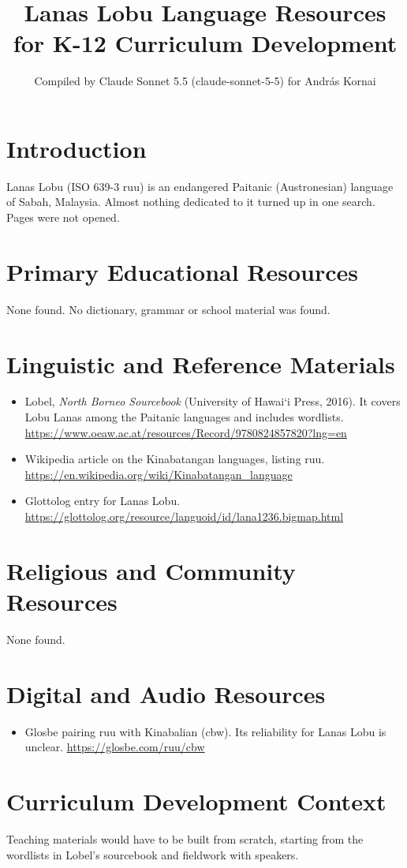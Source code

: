 \documentclass[12pt]{article}
\title{Lanas Lobu Language Resources for K-12 Curriculum Development}
\author{Compiled by Claude Sonnet 5.5 (claude-sonnet-5-5) for Andr\'as Kornai}
\date{}
\begin{document}
\maketitle
\section{Introduction}
Lanas Lobu (ISO 639-3 ruu) is an endangered Paitanic (Austronesian) language of Sabah, Malaysia. Almost nothing dedicated to it turned up in one search. Pages were not opened.

\section{Primary Educational Resources}
None found. No dictionary, grammar or school material was found.

\section{Linguistic and Reference Materials}
\begin{itemize}
\item Lobel, \emph{North Borneo Sourcebook} (University of Hawai\textquoteleft i Press, 2016). It covers Lobu Lanas among the Paitanic languages and includes wordlists. \url{https://www.oeaw.ac.at/resources/Record/9780824857820?lng=en}
\item Wikipedia article on the Kinabatangan languages, listing ruu. \url{https://en.wikipedia.org/wiki/Kinabatangan_language}
\item Glottolog entry for Lanas Lobu. \url{https://glottolog.org/resource/languoid/id/lana1236.bigmap.html}
\end{itemize}

\section{Religious and Community Resources}
None found.

\section{Digital and Audio Resources}
\begin{itemize}
\item Glosbe pairing ruu with Kinabalian (cbw). Its reliability for Lanas Lobu is unclear. \url{https://glosbe.com/ruu/cbw}
\end{itemize}

\section{Curriculum Development Context}
Teaching materials would have to be built from scratch, starting from the wordlists in Lobel's sourcebook and fieldwork with speakers.
\end{document}
